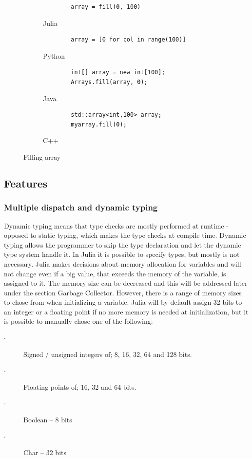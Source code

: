 \documentclass[a4paper, 11pt, titlepage]{article}
\begin{document}
\begin{figure}[H]
	\centering
	\begin{subfigure}[b]{0.7\textwidth}
		\centering
		\begin{lstlisting}
		array = fill(0, 100)
		\end{lstlisting}
		\caption{Julia}
	\end{subfigure}
	\begin{subfigure}[b]{0.7\textwidth}
		\centering
		\begin{lstlisting}
		array = [0 for col in range(100)]
		\end{lstlisting}
		\caption{Python}
	\end{subfigure}	
	\begin{subfigure}[b]{0.7\textwidth}
		\centering
		\begin{lstlisting}
		int[] array = new int[100];
		Arrays.fill(array, 0);
		\end{lstlisting}
		\caption{Java}
	\end{subfigure}
	\begin{subfigure}[b]{0.7\textwidth}
		\centering
		\begin{lstlisting}
		std::array<int,100> array;
		myarray.fill(0);
		\end{lstlisting}
		\caption{C++}
	\end{subfigure}
	\caption{Filling array}
	\label{Filling array with 0's}
\end{figure}

\subsection{Features}
\subsubsection{Multiple dispatch and dynamic typing}
Dynamic typing means that type checks are mostly performed at runtime - opposed to static typing, which makes the type checks at compile time. Dynamic typing allows the programmer to skip the type declaration and let the dynamic type system handle it. In Julia it is possible to specify types, but mostly is not necessary. Julia makes decisions about memory allocation for variables and will not change even if a big value, that exceeds the memory of the variable, is assigned to it. The memory size can be decreased and this will be addressed later under the section Garbage Collector. However, there is a range of memory sizes to chose from when initializing a variable. Julia will by default assign 32 bits to an integer or a floating point if no more memory is needed at initialization, but it is possible to manually chose one of the following:
\begin{description}
	\item[$\cdot$] Signed / unsigned integers of; 8, 16, 32, 64 and 128 bits.
	\item[$\cdot$] Floating points of; 16, 32 and 64 bits.  
	\item[$\cdot$] Boolean – 8 bits 
	\item[$\cdot$] Char – 32 bits 
\end{description}
\end{document}
